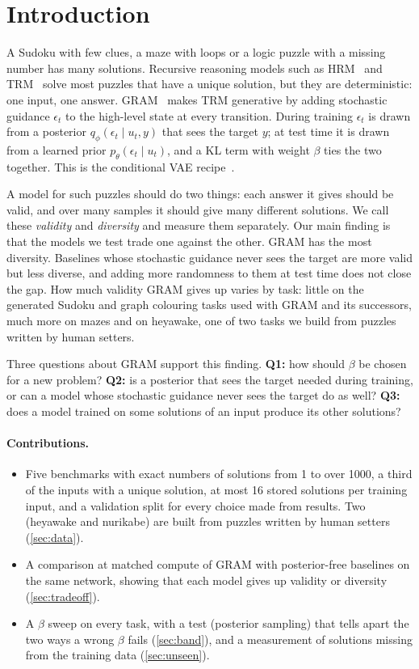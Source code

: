 \documentclass{article}
\begin{document}
\section{Introduction}

A Sudoku with few clues, a maze with loops or a logic puzzle with a missing number has many solutions. Recursive
reasoning models such as HRM~\cite{wang2025hrm} and TRM~\cite{jolicoeur2025trm} solve most puzzles that have a unique
solution, but they are deterministic: one input, one answer. GRAM~\cite{baek2026gram} makes TRM generative by adding
stochastic guidance $\epsilon_t$ to the high-level state at every transition. During training $\epsilon_t$ is drawn
from a posterior $q_\phi(\epsilon_t\mid u_t,y)$ that sees the target $y$; at test time it is drawn from a learned prior
$p_\theta(\epsilon_t\mid u_t)$, and a KL term with weight $\beta$ ties the two together. This is the conditional VAE
recipe~\cite{sohn2015cvae}.

A model for such puzzles should do two things: each answer it gives should be valid, and over many samples it should
give many different solutions. We call these \emph{validity} and \emph{diversity} and measure them separately. Our
main finding is that the models we test trade one against the other. GRAM has the most diversity. Baselines whose
stochastic guidance never sees the target are more valid but less diverse, and adding more randomness to them at test
time does not close the gap. How much validity GRAM gives up varies by task: little on the generated Sudoku and
graph colouring tasks used with GRAM and its successors, much more on mazes and on heyawake, one of two tasks we build
from puzzles written by human setters.

Three questions about GRAM support this finding. \textbf{Q1:} how should $\beta$ be chosen for a new problem?
\textbf{Q2:} is a posterior that sees the target needed during training, or can a model whose stochastic guidance
never sees the target do as well? \textbf{Q3:} does a model trained on some solutions of an input produce its other
solutions?

\paragraph{Contributions.}
\begin{itemize}
  \item Five benchmarks with exact numbers of solutions from 1 to over 1000, a third of the inputs with a unique
  solution, at most 16 stored solutions per training input, and a validation split for every choice made from
  results. Two (heyawake and nurikabe) are built from puzzles written by human setters (\cref{sec:data}).
  \item A comparison at matched compute of GRAM with posterior-free baselines on the same network, showing that each
  model gives up validity or diversity (\cref{sec:tradeoff}).
  \item A $\beta$ sweep on every task, with a test (posterior sampling) that tells apart the two ways a wrong $\beta$
  fails (\cref{sec:band}), and a measurement of solutions missing from the training data (\cref{sec:unseen}).
\end{itemize}
\end{document}
